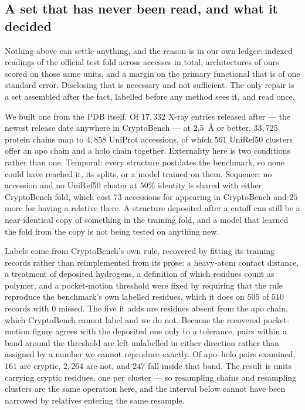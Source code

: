 \documentclass[11pt]{article}
\begin{document}
\subsection{A set that has never been read, and what it decided}
\label{sec:external}
Nothing above can settle anything, and the reason is in our own ledger:
\NIndexedReads{} indexed readings of the official test fold across
\NFoldAccesses{} accesses in total, \NArchOnFold{}
architectures of ours scored on those same units, and a \TabAucD{} margin on the
primary functional that is \LeadInSE{} of one standard error. Disclosing that is
necessary and not sufficient. The only repair is a set assembled after the fact,
labelled before any method sees it, and read once.

We built one from the PDB itself. Of \(17{,}332\) X-ray entries released after
\ExtCutoff{} --- the newest release date anywhere in CryptoBench --- at
\(2.5\)~\AA{} or better, \(33{,}725\) protein chains map to \(4{,}858\) UniProt
accessions, of which \(561\) UniRef50 clusters offer an apo chain and a holo
chain together. Externality here is two conditions rather than one. Temporal:
every structure postdates the benchmark, so none could have reached it, its
splits, or a model trained on them. Sequence: no accession and no UniRef50
cluster at \(50\%\) identity is shared with either CryptoBench fold, which cost
\(73\) accessions for appearing in CryptoBench and \(25\) more for having a
relative there. A structure deposited after a cutoff can still be a
near-identical copy of something in the training fold, and a model that learned
the fold from the copy is not being tested on anything new.

Labels come from CryptoBench's own rule, recovered by fitting its training
records rather than reimplemented from its prose: a heavy-atom contact distance,
a treatment of deposited hydrogens, a definition of which residues count as
polymer, and a pocket-motion threshold were fixed by requiring that the rule
reproduce the benchmark's own labelled residues, which it does on \(505\) of
\(510\) records with \(0\) missed. The five it adds are residues absent from the
apo chain, which CryptoBench cannot label and we do not. Because the recovered
pocket-motion figure agrees with the deposited one only to a tolerance, pairs
within a band around the threshold are left unlabelled in either direction rather
than assigned by a number we cannot reproduce exactly. Of \ExtNPairs{} apo--holo
pairs examined, \(161\) are cryptic, \(2{,}264\) are not, and \(247\) fall inside
that band. The result is \ExtN{} units carrying \ExtNPositives{} cryptic
residues, one per cluster --- so resampling chains and resampling clusters are
the same operation here, and the interval below cannot have been narrowed by
relatives entering the same resample.
\end{document}
